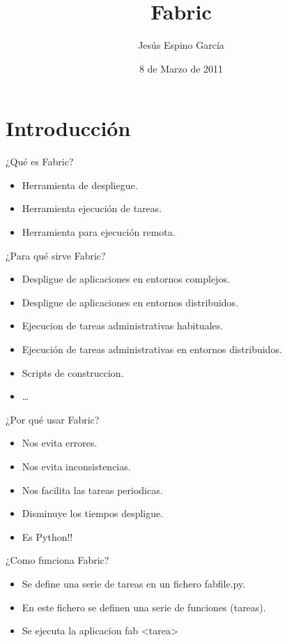 \documentclass[10pt]{beamer}
\title{Fabric}
\author{Jesús Espino García}
\date{8 de Marzo de 2011}
\institute[GUL UC3M]{Python-ESP-Centro}
\begin{document}
  \frame{\maketitle}


  \section*{Introducción}
  \begin{frame}{¿Qué es Fabric?}
    \begin{itemize}
      \item Herramienta de despliegue.
      \item Herramienta ejecución de tareas.
      \item Herramienta para ejecución remota.
    \end{itemize}
  \end{frame}
  
  \begin{frame}{¿Para qué sirve Fabric?}
    \begin{itemize}
      \item Despligue de aplicaciones en entornos complejos.
      \item Despligue de aplicaciones en entornos distribuidos.
      \item Ejecucion de tareas administrativas habituales.
      \item Ejecución de tareas administrativas en entornos distribuidos.
      \item Scripts de construccion.
      \item \dots{}
    \end{itemize}
  \end{frame}
  
  \begin{frame}{¿Por qué usar Fabric?}
    \begin{itemize}
      \item Nos evita errores.
      \item Nos evita inconsistencias.
      \item Nos facilita las tareas periodicas.

      \item Disminuye los tiempos despligue.
      \item Es Python!!
    \end{itemize}
  \end{frame}

  \begin{frame}{¿Como funciona Fabric?}
    \begin{itemize}
      \item Se define una serie de tareas en un fichero fabfile.py.
      \item En este fichero se definen una serie de funciones (tareas).
      \item Se ejecuta la aplicacion fab <tarea>
    \end{itemize}
  \end{frame}
  
\end{document}
